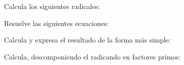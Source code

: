 \documentclass[addpoints,spanish, 12pt,a4paper]{exam}
\begin{document}
\begin{questions}
\begin{multicols}{1}
\begin{parts}
        \end{parts}
        \end{multicols}
        \question Calcula los siguientes radicales:
        \begin{multicols}{1} 
        \end{multicols}
        \question Resuelve las siguientes ecuaciones:
        \begin{multicols}{1} 
        \end{multicols}
        \question Calcula y expresa el resultado de la forma más simple:
        \begin{multicols}{1} 
        \end{multicols}
        \question Calcula, descomponiendo el radicando en factores primos:
        \begin{multicols}{1} 
        \end{multicols}

\end{questions}
\end{document}
